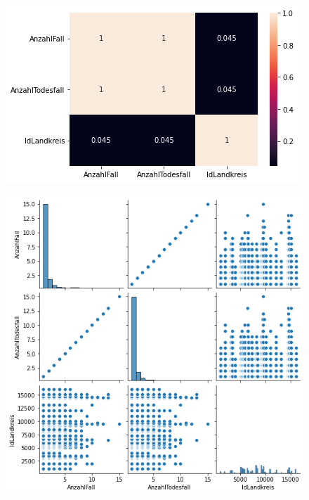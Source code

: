 \begin{figure}[H]
	\centering
	\includegraphics[scale = 0.8]{attachment/chapter_3/Scc081}
\end{figure} 

\begin{figure}[H]
	\centering
	\includegraphics[scale = 0.8]{attachment/chapter_3/Scc080}
\end{figure} 
